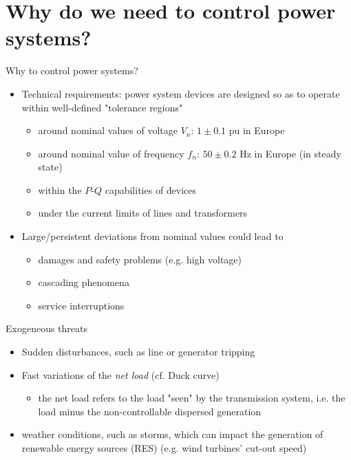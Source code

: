\section{Why do we need to control power systems?}

\begin{frame}{Why to control power systems?}
  \begin{itemize}
      \item Technical requirements: power system devices are designed so as to operate within well-defined "tolerance regions" 
      \begin{itemize}
        \item around nominal values of voltage $V_n$: $1 \pm 0.1$ pu in Europe
        \item around nominal value of frequency $f_n$: $50 \pm 0.2$  Hz in Europe (in steady state)
        \item within the $P$-$Q$ capabilities of devices
        \item under the current limits of lines and transformers
      \end{itemize} 
      \item Large/persistent deviations from nominal values could lead to 
      \begin{itemize}
        \item damages and safety problems (e.g. high voltage)
        \item cascading phenomena
        \item service interruptions
      \end{itemize}
      
  \end{itemize}
\end{frame}

\begin{frame}{Exogeneous threats}
  \begin{itemize}
      \item Sudden disturbances, such as line or generator tripping
      \item Fast variations of the \textit{net load} (cf. Duck curve)
      \begin{itemize}
        \item the net load refers to the load "seen" by the transmission system, i.e. the load minus the non-controllable dispersed generation
      \end{itemize}
      \item weather conditions, such as storms, which can impact the generation of renewable energy sources (RES) (e.g. wind turbines' cut-out speed)
  \end{itemize}
\end{frame}

